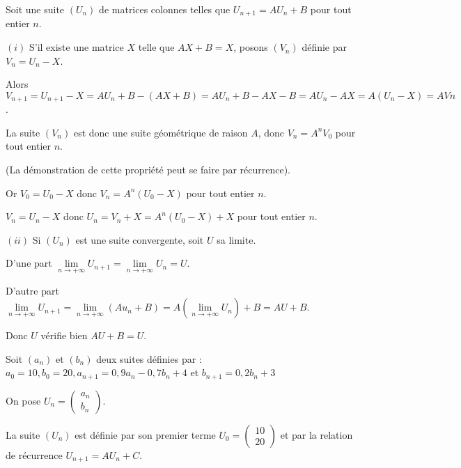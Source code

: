 \documentclass[10pt,a4paper]{article}
\begin{document}
\dem

Soit une suite $(U_n)$ de matrices colonnes telles que $U_{n+1} = AU_n + B$ pour tout entier $n$.

$(i)$ S'il existe une matrice $X$ telle que $AX + B = X$, posons $(V_n)$ définie par $V_n = U_n - X$.

Alors $V_{n+1} = U_{n+1} - X = AU_n + B - (AX + B) = AU_n + B - AX - B = AU_n - AX = A(U_n - X) = AVn$.

La suite $(V_n)$ est donc une suite géométrique de raison $A$, donc $V_n = A^nV_0$ pour tout entier $n$.

(La démonstration de cette propriété peut se faire par récurrence).

\newpage

Or $V_0 = U_0 - X$ donc $V_n = A^n(U_0 - X)$ pour tout entier $n$.

$V_n = U_n - X$ donc $U_n = V_n + X = A^n (U_0 - X) + X$ pour tout entier $n$.


$(ii)$ Si $(U_n)$ est une suite convergente, soit $U$ sa limite.

D'une part $\lim\limits_{n \rightarrow +\infty} U_{n+1}=\lim\limits_{n \rightarrow +\infty} U_{n}=U$.

D'autre part $\lim\limits_{n \rightarrow +\infty} U_{n+1}=\lim\limits_{n \rightarrow +\infty} (Au_n+B)=
A(\lim\limits_{n \rightarrow +\infty} U_n) +B=AU+B$.

Donc $U$ vérifie bien $AU+B=U$.

\medskip

\exe 


Soit $(a_n)$ et $(b_n)$ deux suites définies par : $a_0=10,b_0=20,a_{n+1}=0,9a_n-0,7b_n+4$ et $b_{n+1}=0,2b_n+3$

On pose $U_n=\begin{pmatrix} a_n\\b_n \end{pmatrix}$.


La suite $(U_n)$ est définie par son premier terme $U_0=\begin{pmatrix} 10\\20 \end{pmatrix}$ et par la relation de récurrence $U_{n+1}=AU_n+C$.
\end{document}
